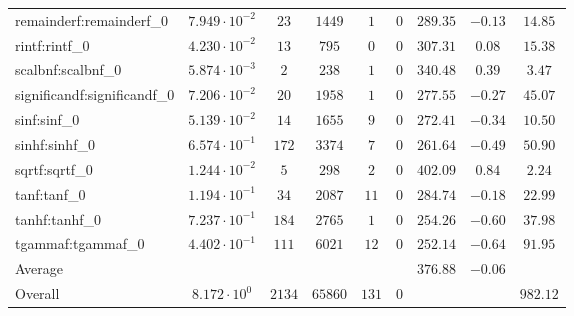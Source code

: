 \begin{tabular}{|l|c|c|c|c|c|c|c|c|}
remainderf:remainderf\_0     & $ 7.949 \cdot 10^{-2} $ & $ 23     $ & $ 1449  $ & $ 1   $ & $ 0   $ & $ 289.35      $ & $ -0.13   $ & $ 14.85   $ \\
rintf:rintf\_0               & $ 4.230 \cdot 10^{-2} $ & $ 13     $ & $ 795   $ & $ 0   $ & $ 0   $ & $ 307.31      $ & $ 0.08    $ & $ 15.38   $ \\
scalbnf:scalbnf\_0           & $ 5.874 \cdot 10^{-3} $ & $ 2      $ & $ 238   $ & $ 1   $ & $ 0   $ & $ 340.48      $ & $ 0.39    $ & $ 3.47    $ \\
significandf:significandf\_0 & $ 7.206 \cdot 10^{-2} $ & $ 20     $ & $ 1958  $ & $ 1   $ & $ 0   $ & $ 277.55      $ & $ -0.27   $ & $ 45.07   $ \\
sinf:sinf\_0                 & $ 5.139 \cdot 10^{-2} $ & $ 14     $ & $ 1655  $ & $ 9   $ & $ 0   $ & $ 272.41      $ & $ -0.34   $ & $ 10.50   $ \\
sinhf:sinhf\_0               & $ 6.574 \cdot 10^{-1} $ & $ 172    $ & $ 3374  $ & $ 7   $ & $ 0   $ & $ 261.64      $ & $ -0.49   $ & $ 50.90   $ \\
sqrtf:sqrtf\_0               & $ 1.244 \cdot 10^{-2} $ & $ 5      $ & $ 298   $ & $ 2   $ & $ 0   $ & $ 402.09      $ & $ 0.84    $ & $ 2.24    $ \\
tanf:tanf\_0                 & $ 1.194 \cdot 10^{-1} $ & $ 34     $ & $ 2087  $ & $ 11  $ & $ 0   $ & $ 284.74      $ & $ -0.18   $ & $ 22.99   $ \\
tanhf:tanhf\_0               & $ 7.237 \cdot 10^{-1} $ & $ 184    $ & $ 2765  $ & $ 1   $ & $ 0   $ & $ 254.26      $ & $ -0.60   $ & $ 37.98   $ \\
tgammaf:tgammaf\_0           & $ 4.402 \cdot 10^{-1} $ & $ 111    $ & $ 6021  $ & $ 12  $ & $ 0   $ & $ 252.14      $ & $ -0.64   $ & $ 91.95   $ \\
\hline
Average                      & $                     $ & $        $ & $       $ & $     $ & $     $ & $ 376.88      $ & $ -0.06   $ & $         $ \\
\hline
Overall                      & $ 8.172 \cdot 10^{0}  $ & $ 2134   $ & $ 65860 $ & $ 131 $ & $ 0   $ & $             $ & $         $ & $ 982.12  $ \\
\hline
\end{tabular}
